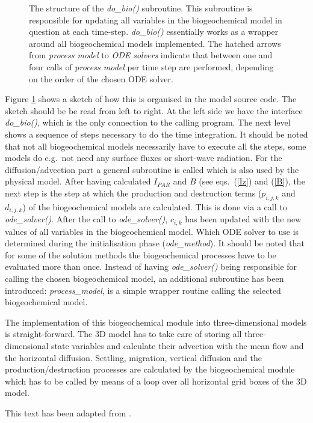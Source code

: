\begin{figure}
\begin{center}
\caption{
The structure of the \emph{do\_bio()} subroutine. This subroutine is responsible
for updating all variables in the biogeochemical model in question at each time-step.
\emph{do\_bio()} essentially works as a wrapper around all biogeochemical models
implemented.
The hatched arrows from \emph{process model} to \emph{ODE solvers}
indicate that between one and four calls 
of  \emph{process model}
per time step are performed, depending on the order of the chosen ODE solver.  
}\label{fig_bio_code}
\end{center}
\end{figure}

Figure \ref{fig_bio_code} shows a sketch of how this is organised in the
model source code. 
The sketch should be be read from left to right. At the left side we have 
the interface \emph{do\_bio()}, which is the only connection to the
calling program. The next level shows a sequence of steps necessary to do the
time integration. It should be noted that not all biogeochemical 
models necessarily
have to execute all the steps, some models do e.g.\
not need any surface fluxes or short-wave radiation.
For the diffusion/advection part a general subroutine is called
which is also used by 
the physical model. 
After having calculated $I_{PAR}$ and $B$ (see eqs.\ (\ref{Iz}) and
(\ref{B}),
the next step is the step at which the production and destruction terms
($p_{i,j,k}$ and $d_{i,j,k}$)
of the biogeochemical models are calculated. This is done via a call to 
\emph{ode\_solver()}. After the call to \emph{ode\_solver()}, $c_{i,k}$
has been updated with the new values of all variables in the
biogeochemical model. Which ODE solver to use is determined during the 
initialisation phase (\emph{ode\_method}).
It should be noted
that for some of the solution methods the biogeochemical processes have to 
be evaluated more than once. Instead of having \emph{ode\_solver()} being 
responsible for calling the chosen biogeochemical model,
an additional subroutine
has been introduced: \emph{process\_model}, is a simple
wrapper routine calling the selected biogeochemical model.

The implementation of this biogeochemical module into three-dimensional models
is straight-forward. The 3D model has to take care of storing all
three-dimensional state variables and calculate their advection with the
mean flow and the horizontal diffusion.
Settling, migration, vertical diffusion and the production/destruction
processes are calculated by the biogeochemical module which has to be
called by means of a loop over all horizontal grid boxes of the 3D
model.



This text has been adapted from \cite{Burchardetal05}.

